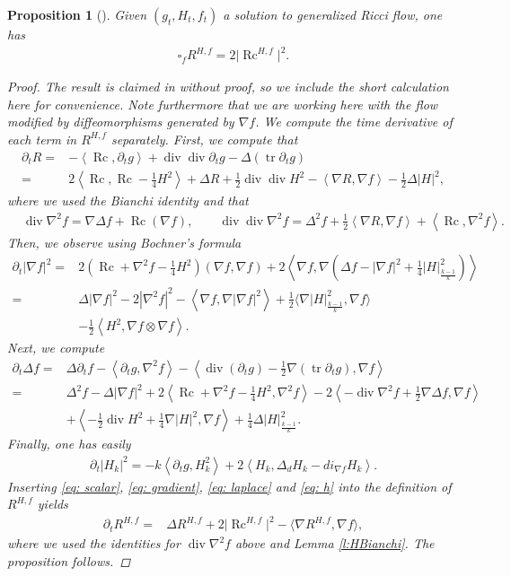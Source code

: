 \documentclass[pdftex]{sigma}
\numberwithin{equation}{section}
\newtheorem{prop}[thm]{Proposition}
 { \theoremstyle{definition}
\newtheorem{defn}[thm]{Definition}
\newtheorem{Note}[thm]{Note}
\newtheorem{Example}[thm]{Example}
\newtheorem{rmk}[thm]{Remark} }
\newcommand{\del}{\partial}
\newcommand{\N}{\nabla}
\newcommand{\IP}[1]{\left<#1\right>}
\newcommand{\wwnorm}[1]{\left|#1\right|^2_{\frac{k-1}k}}
\DeclareMathOperator{\Rc}{Rc}
\DeclareMathOperator{\tr}{tr}
\DeclareMathOperator{\divg}{div}
\begin{document}
\begin{prop}[{\cite[Proposition 2.11]{Streetsscalar}}]\label{p:scalarmonotonicity} Given $(g_t, H_t, f_t)$ a solution to generalized Ricci flow, one has
\begin{align*}
\square_f R^{H,f} = 2 \big|\Rc^{H,f}\big|^2.
\end{align*}
\begin{proof} The result is claimed in \cite{Streetsscalar} without proof, so we include the short calculation here for convenience. Note furthermore that we are working here with the flow modified by diffeomorphisms generated by $\N f$. We compute the time derivative of each term in $R^{H,f}$ separately.
First, we compute that
	\begin{align}
 	\del_t R={}&-\IP{\Rc,\del_tg}+\divg\divg\del_t g-\Delta(\tr \del_t g)\nonumber\\
 ={}& 2\IP{\Rc,\Rc-\frac14 H^2}+\Delta R+\frac12\divg\divg H^2-\IP{\N R,\N f}-\frac12\Delta|H|^2, \label{eq: scalar}
 \end{align}
 	where we used the Bianchi identity and that
 	\begin{align*}
 	&\divg \N^2f= \N\Delta f+\Rc(\N f),\qquad\divg\divg \N^2f= \Delta^2 f+\frac12\IP{\N R,\N f}+\IP{\Rc,\N^2 f}.
 	\end{align*}
 	Then, we observe using Bochner's formula
 	\begin{align}
 	\del_t|\N f|^2={}& 2\left(\Rc+\N^2 f-\frac14 H^2\right)(\N f,\N f)+2\IP{\N f,\N\left( \Delta f-|\N f|^2 + \frac{1}{4} \wwnorm{H} \right)}\nonumber\\
 ={}& \Delta|\N f|^2-2|\N^2f|^2-\IP{\N f,\N |\N f|^2}+\frac12\big\langle\N\wwnorm{H},\N f\big\rangle\nonumber\\
 &-\frac12\IP{H^2,\N f\otimes \N f}.\label{eq: gradient}
 \end{align}
 Next, we compute 	
 	\begin{align}
 	\del_t \Delta f={}&\Delta \del_t f-\IP{\del_t g,\N^2 f}-\IP{\divg(\del_tg)-\frac12\N(\tr\del_tg),\N f}\nonumber\\
 ={}&\Delta^2 f-\Delta|\N f|^2+2\IP{\Rc+\N^2 f-\frac14 H^2,\N^2 f}-2\IP{-\divg\N^2f+\frac12\N\Delta f,\N f}\nonumber\\
 	& +\IP{-\frac12\divg H^2+\frac14\N |H|^2,\N f}+\frac14\Delta \wwnorm{H}.\label{eq: laplace}
 \end{align}
 	Finally, one has easily
 	\begin{align} \label{eq: h}
 	\del_t |H_k|^2=-k\IP{\del_t g, H_k^2}+2\IP{H_k,\Delta_d H_k-di_{\N f} H_k}.
 	\end{align}
 	Inserting \eqref{eq: scalar}, \eqref{eq: gradient}, \eqref{eq: laplace} and \eqref{eq: h} into the definition of $R^{H,f}$ yields
 \begin{align*}
 	\del_tR^{H,f}
 	={}&\Delta R^{H,f}+2\big|\Rc^{H,f}\big|^2-\big\langle\N R^{H,f},\N f\big\rangle,
 	\end{align*}
 where we used the identities for $\divg \N^2 f$ above and Lemma \ref{l:HBianchi}. The proposition follows.
\end{proof}
\end{prop}
\end{document}

